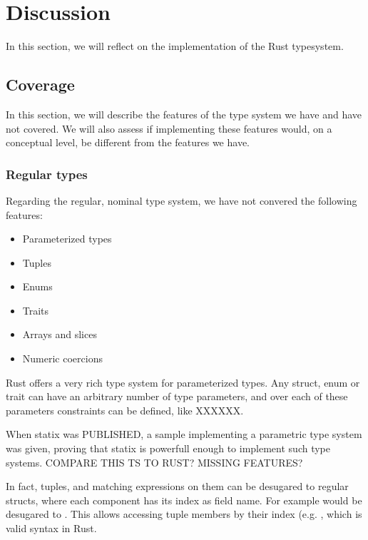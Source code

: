 \section{Discussion}

In this section, we will reflect on the implementation of the Rust typesystem.

\subsection{Coverage}

In this section, we will describe the features of the type system we have and have not covered. We will also assess if implementing these features would, on a conceptual level, be different from the features we have.

\subsubsection{Regular types}

Regarding the regular, nominal type system, we have not convered the following features:

\begin{itemize}
	\item Parameterized types
	\item Tuples
	\item Enums
	\item Traits
	\item Arrays and slices
	\item Numeric coercions
\end{itemize}


Rust offers a very rich type system for parameterized types. Any struct, enum or trait can have an arbitrary number of type parameters, and over each of these parameters constraints can be defined, like XXXXXX.

When statix was PUBLISHED, a sample implementing a parametric type system was given, proving that statix is powerfull enough to implement such type systems. COMPARE THIS TS TO RUST? MISSING FEATURES?


In fact, tuples, and matching expressions on them can be desugared to regular structs, where each component has its index as field name. For example  would be desugared to . This allows accessing tuple members by their index (e.g. , which is valid syntax in Rust.

